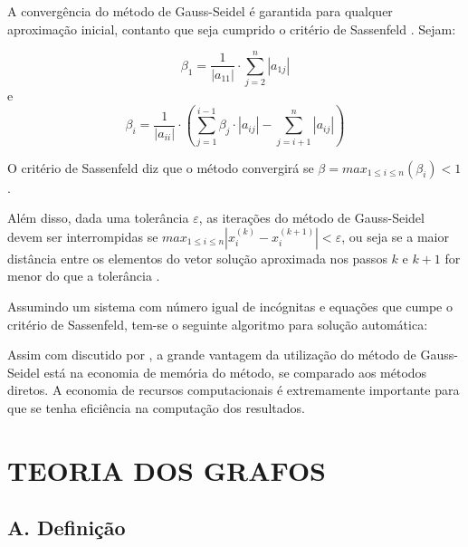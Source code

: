 \documentclass[twocolumn, 10pt]{extarticle}
\begin{document}
A convergência do método de Gauss-Seidel é garantida para qualquer aproximação inicial, contanto que seja cumprido o critério de Sassenfeld \cite[p. 171]{ruggiero}. Sejam:

\[
\beta_1 = \frac{1}{|a_{11}|} \cdot \sum_{j=2}^{n} |a_{1j}|
\]
e
\[
\beta_i = \frac{1}{|a_{ii}|} \cdot \left(\sum_{j=1}^{i-1} \beta_j\cdot |a_{ij}| - \sum_{j=i+1}^{n} |a_{ij}|\right)
\]

O critério de Sassenfeld diz que o método convergirá se $\beta = max_{1 \leq i \leq n} (\beta_i) < 1$ \cite[p. 173]{ruggiero}.

Além disso, dada uma tolerância $\varepsilon$, as iterações do método de Gauss-Seidel devem ser interrompidas se $max_{1 \leq i \leq n} |x^{(k)}_i-x^{(k+1)}_i| < \varepsilon$, ou seja se a maior distância entre os elementos do vetor solução aproximada nos passos $k$ e $k+1$ for menor do que a tolerância \cite[p. 155]{ruggiero}.

Assumindo um sistema com número igual de incógnitas e equações que cumpe o critério de Sassenfeld, tem-se o seguinte algoritmo para solução automática:

\begingroup
{}\label{gs}
\begin{algorithmic}[1]
			\EndFor
			\EndFor
		\EndFor
		\EndIf
	\EndFor
\EndFunction
\end{algorithmic}
\hrulefill
\endgroup

Assim com discutido por \cite{chapra}, a grande vantagem da utilização do método de Gauss-Seidel está na economia de memória do método, se comparado aos métodos diretos. A economia de recursos computacionais é extremamente importante para que se tenha eficiência na computação dos resultados. 


\section{TEORIA DOS GRAFOS}
\subsection*{A. \quad Definição}
\end{document}
